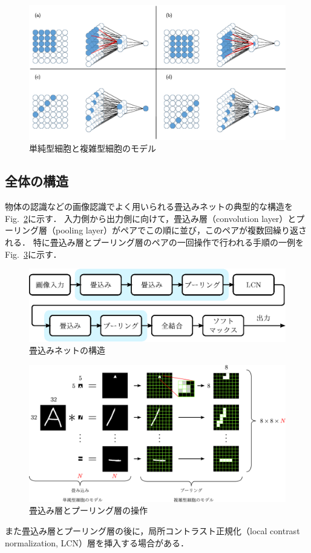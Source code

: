 \documentclass[a4paper,10pt]{jsarticle}
\begin{document}
\begin{figure}[t]
 \centering
 \includegraphics[scale=0.4]{fig/eps/cnn62.eps}
  \caption{単純型細胞と複雑型細胞のモデル}
  \label{fig:単純型細胞と複雑型細胞のモデル}
\end{figure}

\subsection{全体の構造}
物体の認識などの画像認識でよく用いられる畳込みネットの典型的な構造をFig.~\ref{fig:畳込みネットの構造}に示す．
入力側から出力側に向けて，畳込み層（convolution layer）とプーリング層（pooling layer）がペアでこの順に並び，このペアが複数回繰り返される．
特に畳込み層とプーリング層のペアの一回操作で行われる手順の一例をFig.~\ref{fig:畳込み層とプーリング層の操作}に示す．
\begin{figure}[t]
 \centering
 \includegraphics[scale=0.65]{fig/eps/structure.eps}
  \caption{畳込みネットの構造}
  \label{fig:畳込みネットの構造}
\end{figure}
\begin{figure}[t]
 \centering
 \includegraphics[width=140mm]{fig/eps/conv_pool.eps}
  \caption{畳込み層とプーリング層の操作}
  \label{fig:畳込み層とプーリング層の操作}
\end{figure}
また畳込み層とプーリング層の後に，局所コントラスト正規化（local contrast normalization, LCN）層を挿入する場合がある．
\end{document}

